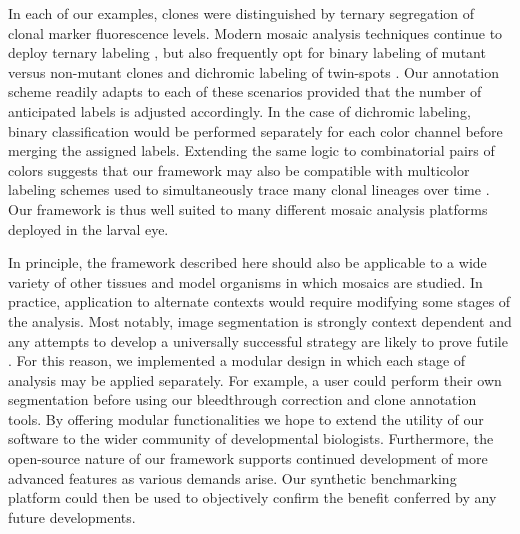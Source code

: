 In each of our examples, clones were distinguished by ternary segregation of clonal marker fluorescence levels. Modern mosaic analysis techniques continue to deploy ternary labeling \cite{Gambis2011,Dourlen2013}, but also frequently opt for binary labeling of mutant versus non-mutant clones \cite{Fisher2017,Wu2007,Zhou2016} and dichromic labeling of twin-spots \cite{Heffern2009,Yu2010}. Our annotation scheme readily adapts to each of these scenarios provided that the number of anticipated labels is adjusted accordingly. In the case of dichromic labeling, binary classification would be performed separately for each color channel before merging the assigned labels. Extending the same logic to combinatorial pairs of colors suggests that our framework may also be compatible with multicolor labeling schemes used to simultaneously trace many clonal lineages over time \cite{Denes2013,Hadjieconomou2011,Hampel2011}. Our framework is thus well suited to many different mosaic analysis platforms deployed in the larval eye.

In principle, the framework described here should also be applicable to a wide variety of other tissues \cite{Neufeld1998,Tworoger1999} and model organisms \cite{Collins2010,Munoz-Jimenez2017,Wang2007} in which mosaics are studied. In practice, application to alternate contexts would require modifying some stages of the analysis. Most notably, image segmentation is strongly context dependent and any attempts to develop a universally successful strategy are likely to prove futile \cite{Meijering2012}. For this reason, we implemented a modular design in which each stage of analysis may be applied separately. For example, a user could perform their own segmentation before using our bleedthrough correction and clone annotation tools. By offering modular functionalities we hope to extend the utility of our software to the wider community of developmental biologists. Furthermore, the open-source nature of our framework supports continued development of more advanced features as various demands arise. Our synthetic benchmarking platform could then be used to objectively confirm the benefit conferred by any future developments.
